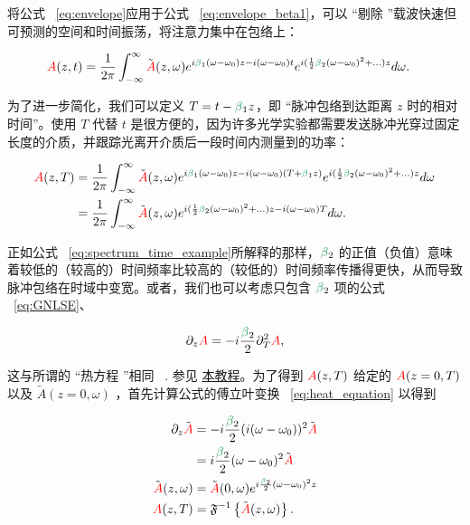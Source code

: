 \label{sec:GVD}

将公式 ~\ref{eq:envelope}应用于公式 ~\ref{eq:envelope_beta1}，可以 “剔除 ”载波快速但可预测的空间和时间振荡，将注意力集中在包络上：

\begin{align}
    \A(z,t)  &= \frac{1}{2\pi}  \int_{-\infty}^{\infty} \Tilde{\A}(z,\omega) e^{i\betag_1(\omega-\omega_0)z-i(\omega-\omega_0) t} e^{i(\frac{1}{2}\betag_2(\omega-\omega_0)^2+...)z} d\omega.
\end{align}

为了进一步简化，我们可以定义 $T=t-\betag_1z$，即 “脉冲包络到达距离 $z$ 时的相对时间”。使用 $T$ 代替 $t$ 是很方便的，因为许多光学实验都需要发送脉冲光穿过固定长度的介质，并跟踪光离开介质后一段时间内测量到的功率：   

\begin{align}
    \A(z,T)  &= \frac{1}{2\pi}  \int_{-\infty}^{\infty} \Tilde{\A}(z,\omega) e^{i\betag_1(\omega-\omega_0)z-i(\omega-\omega_0) (T+\betag_1z)} e^{i(\frac{1}{2}\betag_2(\omega-\omega_0)^2+...)z} d\omega \\ \nonumber
    &= \frac{1}{2\pi}  \int_{-\infty}^{\infty} \Tilde{\A}(z,\omega) e^{i(\frac{1}{2}\betag_2(\omega-\omega_0)^2+...)z-i(\omega-\omega_0)T} d\omega.
\end{align} 

正如公式 ~\ref{eq:spectrum_time_example}所解释的那样，$\betag_2$ 的正值（负值）意味着较低的（较高的）时间频率比较高的（较低的）时间频率传播得更快，从而导致脉冲包络在时域中变宽。或者，我们也可以考虑只包含 $\betag_2$ 项的公式 ~\ref{eq:GNLSE}、

\begin{align}
    \label{eq:heat_equation}
    \partial_z \A = -i  \frac{\betag_2}{2}\partial_T^2\A,
\end{align}

这与所谓的 “热方程 ”相同 ~\cite{Fourier_heat_original,Fourier_heat_english}. 参见 
\href{https://digitalcommons.ursinus.edu/cgi/viewcontent.cgi?article=1008&context=triumphs_differ}{本教程}。为了得到 $\textcolor{red}{A}(z,T)$ 给定的 $\textcolor{red}{A}(z=0,T)$ 以及 $\tilde{A}(z=0,\omega)$ ，首先计算公式的傅立叶变换 ~\ref{eq:heat_equation} 以得到

\begin{align}
    \label{eq:beta2_broadening}
    \partial_z \Tilde{\A} &= -i  \frac{\betag_2}{2} (i(\omega-\omega_0))^2 \Tilde{\A} \\ \nonumber
    &= i  \frac{\betag_2}{2}(\omega-\omega_0)^2\Tilde{\A} \\ \nonumber
    \Tilde{\A}(z,\omega)&=\Tilde{\A}(0,\omega)e^{i\frac{\betag_2}{2}(\omega-\omega_0)^2z} \\ \nonumber
    \A(z,T) &= \IFT\left\{  \Tilde{\A}(z,\omega)   \right\}.
\end{align}

